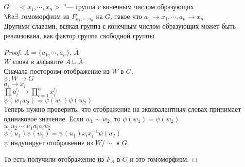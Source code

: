 \begin{theorem}
$G = <x_1, \cdots, x_n>$ "--- группа с конечным числом образующих\\
$\Ra \exists$ гомоморфизм из $F_{a_1, \cdots, a_n}$ на $G$, 
такое что $a_1 \to x_1, \cdots, a_n \to x_n$\\

Другими славами, всякая группа с конечным числом образующих может быть реализована, как
фактор группа свободной группы.
\end{theorem}
\begin{proof}
$A = \{a_1, \cdots, a_n\}$, $\bar{A}$\\
$W$ слова в алфавите $A \cup \bar{A}$\\
Сначала постороим отображение из $W$ в $G$.\\
$\psi \colon W \to G$\\
$a_i \to x_i$\\
$\prod a_i^{\epsilon_i} \to \prod_{i = 1}^{n} x_i^{\epsilon_i}$\\
$\psi(w_1w_2) = \psi(w_1)\psi(w_2)$\\

Теперь нужно проверить, что отображение на эквивалентных словах принимает одинаковое значение.
Если $w_1 \sim w_2$, то $\psi(w_1) = \psi(w_2)$\\
$u_1u_2 \sim u_1a_i\bar{a_i}u_2$\\
$\psi(u_1)\psi(u_2) = \psi(u_1)x_ix_i^{-1}\psi(u_2)$\\
$\psi$ индуцирует отображение из $W/\sim$ в $G$.

То есть получили отображение из $F_A$ в $G$ и это
гомоморфизм.
\end{proof}